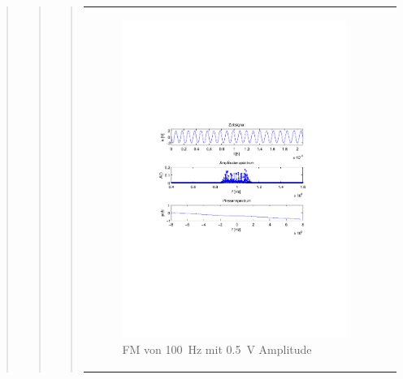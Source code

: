\begin{quote}
\begin{quote}
\begin{quote}
\begin{center}
\begin{tabular}{ll}
                \begin{minipage}{0.6\textwidth}
                    \begin{figure}[H]
                        \label{fig:f100_1}
                        \includegraphics[scale=0.7, trim = 35mm 100mm 35mm 95mm, clip]{Bilder/f100_05}
                        \caption{FM von \SI{100}{\hertz} mit \SI{0,5}{\volt} Amplitude}
                    \end{figure}
                \end{minipage}
            
            \end{tabular}
            \end{center}
            

\end{quote}
\end{quote}
\end{quote}
